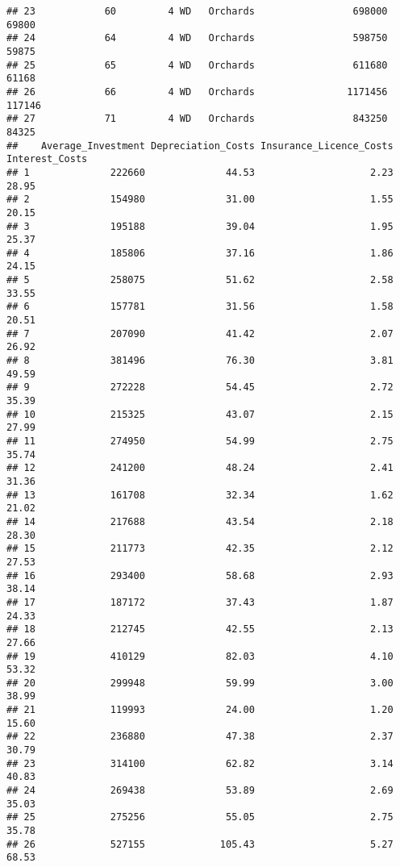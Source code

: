 \documentclass[
]{article}
\begin{document}
\begin{verbatim}
## 23            60         4 WD   Orchards                 698000         69800
## 24            64         4 WD   Orchards                 598750         59875
## 25            65         4 WD   Orchards                 611680         61168
## 26            66         4 WD   Orchards                1171456        117146
## 27            71         4 WD   Orchards                 843250         84325
##    Average_Investment Depreciation_Costs Insurance_Licence_Costs Interest_Costs
## 1              222660              44.53                    2.23          28.95
## 2              154980              31.00                    1.55          20.15
## 3              195188              39.04                    1.95          25.37
## 4              185806              37.16                    1.86          24.15
## 5              258075              51.62                    2.58          33.55
## 6              157781              31.56                    1.58          20.51
## 7              207090              41.42                    2.07          26.92
## 8              381496              76.30                    3.81          49.59
## 9              272228              54.45                    2.72          35.39
## 10             215325              43.07                    2.15          27.99
## 11             274950              54.99                    2.75          35.74
## 12             241200              48.24                    2.41          31.36
## 13             161708              32.34                    1.62          21.02
## 14             217688              43.54                    2.18          28.30
## 15             211773              42.35                    2.12          27.53
## 16             293400              58.68                    2.93          38.14
## 17             187172              37.43                    1.87          24.33
## 18             212745              42.55                    2.13          27.66
## 19             410129              82.03                    4.10          53.32
## 20             299948              59.99                    3.00          38.99
## 21             119993              24.00                    1.20          15.60
## 22             236880              47.38                    2.37          30.79
## 23             314100              62.82                    3.14          40.83
## 24             269438              53.89                    2.69          35.03
## 25             275256              55.05                    2.75          35.78
## 26             527155             105.43                    5.27          68.53

\end{verbatim}
\end{document}
